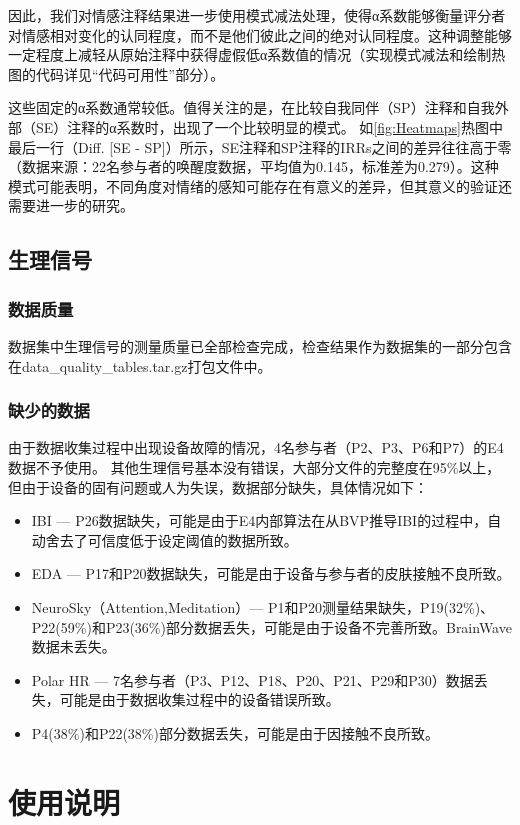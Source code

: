 因此，我们对情感注释结果进一步使用模式减法处理，使得α系数能够衡量评分者对情感相对变化的认同程度，而不是他们彼此之间的绝对认同程度。这种调整能够一定程度上减轻从原始注释中获得虚假低α系数值的情况（实现模式减法和绘制热图的代码详见“代码可用性”部分）。

这些固定的α系数通常较低。值得关注的是，在比较自我同伴（SP）注释和自我外部（SE）注释的α系数时，出现了一个比较明显的模式。
如\autoref{fig:Heatmaps}热图中最后一行（Diff. [SE - SP]）所示，SE注释和SP注释的IRRs之间的差异往往高于零
（数据来源：22名参与者的唤醒度数据，平均值为0.145，标准差为0.279）。这种模式可能表明，不同角度对情绪的感知可能存在有意义的差异，但其意义的验证还需要进一步的研究。

\subsection{生理信号}
\subsubsection{数据质量}
数据集中生理信号的测量质量已全部检查完成，检查结果作为数据集的一部分包含在data\_quality\_tables.tar.gz打包文件中。
\subsubsection{缺少的数据}
由于数据收集过程中出现设备故障的情况，4名参与者（P2、P3、P6和P7）的E4数据不予使用。
其他生理信号基本没有错误，大部分文件的完整度在95\%以上，但由于设备的固有问题或人为失误，数据部分缺失，具体情况如下：
\begin{itemize}
    \item IBI — P26数据缺失，可能是由于E4内部算法在从BVP推导IBI的过程中，自动舍去了可信度低于设定阈值的数据所致。
    \item EDA — P17和P20数据缺失，可能是由于设备与参与者的皮肤接触不良所致。
    \item NeuroSky（Attention,Meditation）— P1和P20测量结果缺失，P19(32\%)、P22(59\%)和P23(36\%)部分数据丢失，可能是由于设备不完善所致。BrainWave数据未丢失。
    \item Polar HR — 7名参与者（P3、P12、P18、P20、P21、P29和P30）数据丢失，可能是由于数据收集过程中的设备错误所致。
    \item P4(38\%)和P22(38\%)部分数据丢失，可能是由于因接触不良所致。
\end{itemize}

\section{使用说明}
